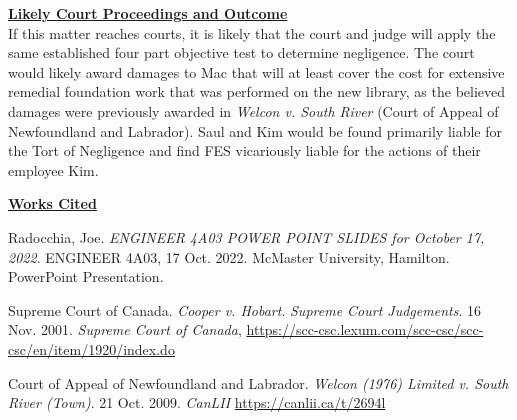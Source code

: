 \documentclass[12pt,letterpaper]{article}
\begin{document}
\par
\textbf{\underline{Likely Court Proceedings and Outcome}}\\
\indent
If this matter reaches courts, it is likely that the court and judge will apply the same established four part objective test to determine negligence. The court would likely award damages to Mac that will at least cover the cost for extensive remedial foundation work that was performed on the new library, as the believed damages were previously awarded in \textit{Welcon v. South River} (Court of Appeal of Newfoundland and Labrador). Saul and Kim would be found primarily liable for the Tort of Negligence and find FES vicariously liable for the actions of their employee Kim.

\clearpage 
\noindent
\textbf{\underline{Works Cited}}

\begin{hangparas}{1em}{1}
Radocchia, Joe. \textit{ENGINEER 4A03 POWER POINT SLIDES for October 17, 2022}. ENGINEER 4A03, 17 Oct. 2022. McMaster University, Hamilton. PowerPoint Presentation.

Supreme Court of Canada. \textit{Cooper v. Hobart}. \textit{Supreme Court Judgements}. 16 Nov. 2001. \textit{Supreme Court of Canada}, \url{https://scc-csc.lexum.com/scc-csc/scc-csc/en/item/1920/index.do}

Court of Appeal of Newfoundland and Labrador. \textit{Welcon (1976) Limited v. South River (Town)}. 21 Oct. 2009. \textit{CanLII} \url{https://canlii.ca/t/2694l}
\end{hangparas}
\end{document}
